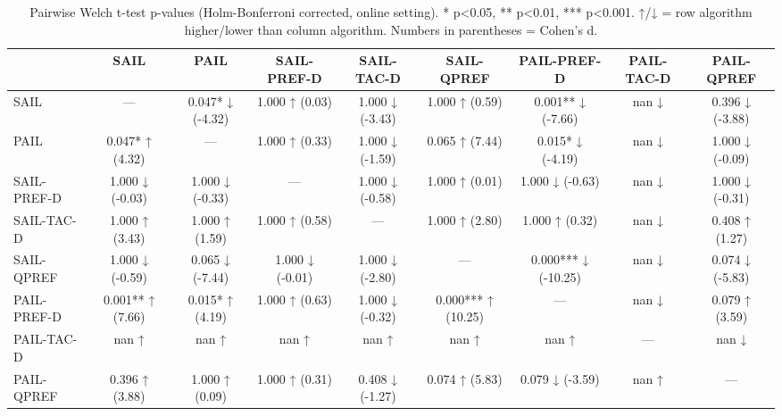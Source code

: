 \begin{table}[t]
\centering
\small
\begin{table}
\caption{Pairwise Welch t-test p-values (Holm-Bonferroni corrected, online setting). * p<0.05, ** p<0.01, *** p<0.001. ↑/↓ = row algorithm higher/lower than column algorithm. Numbers in parentheses = Cohen's d.}
\label{tab:pairwise_online}
\begin{tabular}{lcccccccc}
\toprule
 & SAIL & PAIL & SAIL-PREF-D & SAIL-TAC-D & SAIL-QPREF & PAIL-PREF-D & PAIL-TAC-D & PAIL-QPREF \\
\midrule
SAIL & — & 0.047* ↓ (-4.32) & 1.000 ↑ (0.03) & 1.000 ↓ (-3.43) & 1.000 ↑ (0.59) & 0.001** ↓ (-7.66) & nan ↓ & 0.396 ↓ (-3.88) \\
PAIL & 0.047* ↑ (4.32) & — & 1.000 ↑ (0.33) & 1.000 ↓ (-1.59) & 0.065 ↑ (7.44) & 0.015* ↓ (-4.19) & nan ↓ & 1.000 ↓ (-0.09) \\
SAIL-PREF-D & 1.000 ↓ (-0.03) & 1.000 ↓ (-0.33) & — & 1.000 ↓ (-0.58) & 1.000 ↑ (0.01) & 1.000 ↓ (-0.63) & nan ↓ & 1.000 ↓ (-0.31) \\
SAIL-TAC-D & 1.000 ↑ (3.43) & 1.000 ↑ (1.59) & 1.000 ↑ (0.58) & — & 1.000 ↑ (2.80) & 1.000 ↑ (0.32) & nan ↓ & 0.408 ↑ (1.27) \\
SAIL-QPREF & 1.000 ↓ (-0.59) & 0.065 ↓ (-7.44) & 1.000 ↓ (-0.01) & 1.000 ↓ (-2.80) & — & 0.000*** ↓ (-10.25) & nan ↓ & 0.074 ↓ (-5.83) \\
PAIL-PREF-D & 0.001** ↑ (7.66) & 0.015* ↑ (4.19) & 1.000 ↑ (0.63) & 1.000 ↓ (-0.32) & 0.000*** ↑ (10.25) & — & nan ↓ & 0.079 ↑ (3.59) \\
PAIL-TAC-D & nan ↑ & nan ↑ & nan ↑ & nan ↑ & nan ↑ & nan ↑ & — & nan ↓ \\
PAIL-QPREF & 0.396 ↑ (3.88) & 1.000 ↑ (0.09) & 1.000 ↑ (0.31) & 0.408 ↓ (-1.27) & 0.074 ↑ (5.83) & 0.079 ↓ (-3.59) & nan ↑ & — \\
\bottomrule
\end{tabular}
\end{table}
\end{table}
